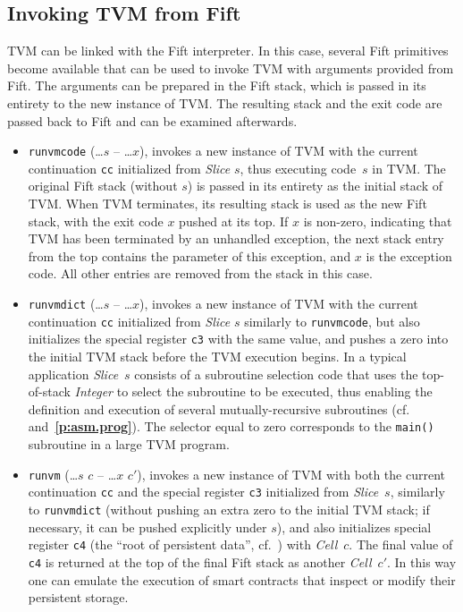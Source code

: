 \documentclass[12pt,oneside]{article}
\def\refpoint#1{{\rm\textbf{\ref{#1}}}}
\let\ptref=\refpoint
\def\mysubsection#1{\subsection{#1}\fancyhead[C]{\small{\textsc{\textrm{\thesubsection.} #1}}}}
\begin{document}
\mysubsection{Invoking TVM from Fift}\label{p:tvm.ops}
TVM can be linked with the Fift interpreter. In this case, several Fift primitives become available that can be used to invoke TVM with arguments provided from Fift. The arguments can be prepared in the Fift stack, which is passed in its entirety to the new instance of TVM. The resulting stack and the exit code are passed back to Fift and can be examined afterwards.
\begin{itemize}
\item {\tt runvmcode} (\dots $s$ -- \dots $x$), invokes a new instance of TVM with the current continuation {\tt cc} initialized from {\em Slice\/} $s$, thus executing code~$s$ in TVM. The original Fift stack (without $s$) is passed in its entirety as the initial stack of TVM. When TVM terminates, its resulting stack is used as the new Fift stack, with the exit code $x$ pushed at its top. If $x$ is non-zero, indicating that TVM has been terminated by an unhandled exception, the next stack entry from the top contains the parameter of this exception, and $x$ is the exception code. All other entries are removed from the stack in this case.
\item {\tt runvmdict} (\dots $s$ -- \dots $x$), invokes a new instance of TVM with the current continuation {\tt cc} initialized from {\em Slice\/} $s$ similarly to {\tt runvmcode}, but also initializes the special register {\tt c3} with the same value, and pushes a zero into the initial TVM stack before the TVM execution begins. In a typical application {\em Slice\/}~$s$ consists of a subroutine selection code that uses the top-of-stack {\em Integer\/} to select the subroutine to be executed, thus enabling the definition and execution of several mutually-recursive subroutines (cf.~\cite[4.6]{TVM} and~\ptref{p:asm.prog}). The selector equal to zero corresponds to the {\tt main()} subroutine in a large TVM program.
\item {\tt runvm} (\dots $s$ $c$ -- \dots $x$ $c'$), invokes a new instance of TVM with both the current continuation {\tt cc} and the special register {\tt c3} initialized from {\em Slice\/}~$s$, similarly to {\tt runvmdict} (without pushing an extra zero to the initial TVM stack; if necessary, it can be pushed explicitly under $s$), and also initializes special register {\tt c4} (the ``root of persistent data'', cf.~\cite[1.4]{TVM}) with {\em Cell\/}~$c$. The final value of {\tt c4} is returned at the top of the final Fift stack as another {\em Cell\/}~$c'$. In this way one can emulate the execution of smart contracts that inspect or modify their persistent storage.

\end{itemize}
\end{document}
